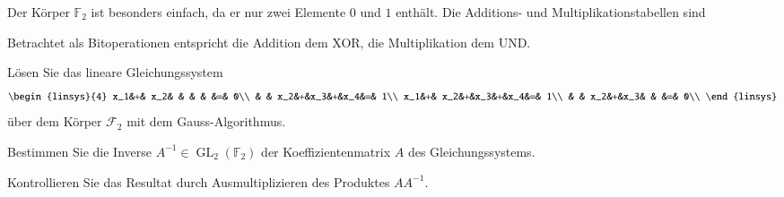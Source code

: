 Der Körper $\mathbb{F}_2$ ist besonders einfach, da er nur zwei Elemente
$0$ und $1$ enthält.
Die Additions- und Multiplikationstabellen sind
\begin{center}
\end{center}
Betrachtet als Bitoperationen entspricht die Addition dem XOR, die
Multiplikation dem UND.
\begin{teilaufgaben}
\item
Lösen Sie das lineare Gleichungssystem
\[
\begin{linsys}{4}
x_1&+& x_2& &   & &   &=& 0\\
   & & x_2&+&x_3&+&x_4&=& 1\\
x_1&+& x_2&+&x_3&+&x_4&=& 1\\
   & & x_2&+&x_3& &   &=& 0\\
\end{linsys}
\]
über dem Körper $\mathcal{F}_2$ mit dem Gauss-Algorithmus.
\item Bestimmen Sie die Inverse $A^{-1}\in \operatorname{GL}_2(\mathbb{F}_2)$
der Koeffizientenmatrix $A$ des Gleichungssystems.
\item Kontrollieren Sie das Resultat durch Ausmultiplizieren des Produktes
$AA^{-1}$.
\end{teilaufgaben}


